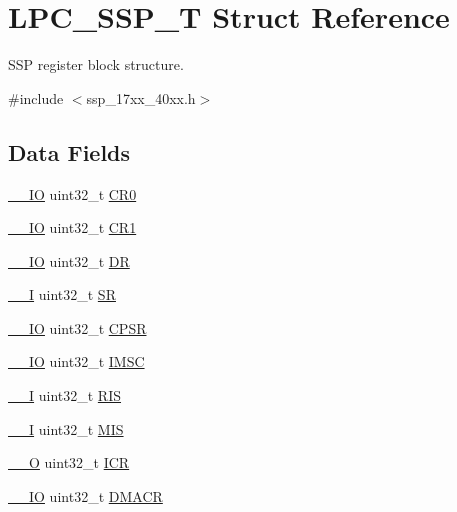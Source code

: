 \hypertarget{structLPC__SSP__T}{\section{L\-P\-C\-\_\-\-S\-S\-P\-\_\-\-T Struct Reference}
\label{structLPC__SSP__T}
}


S\-S\-P register block structure.  




{\ttfamily \#include $<$ssp\-\_\-17xx\-\_\-40xx.\-h$>$}

\subsection*{Data Fields}
\begin{DoxyCompactItemize}
\item 
\hyperlink{core__cm3_8h_aec43007d9998a0a0e01faede4133d6be}{\-\_\-\-\_\-\-I\-O} uint32\-\_\-t \hyperlink{structLPC__SSP__T_af8ad155254cb659608f4c1c6bd83b62b}{C\-R0}
\item 
\hyperlink{core__cm3_8h_aec43007d9998a0a0e01faede4133d6be}{\-\_\-\-\_\-\-I\-O} uint32\-\_\-t \hyperlink{structLPC__SSP__T_a648b740833659e86e8be3a8f6c17147c}{C\-R1}
\item 
\hyperlink{core__cm3_8h_aec43007d9998a0a0e01faede4133d6be}{\-\_\-\-\_\-\-I\-O} uint32\-\_\-t \hyperlink{structLPC__SSP__T_a7a32964f3ca72981b80cf4012c515ea8}{D\-R}
\item 
\hyperlink{core__cm3_8h_af63697ed9952cc71e1225efe205f6cd3}{\-\_\-\-\_\-\-I} uint32\-\_\-t \hyperlink{structLPC__SSP__T_a5f6421682b9a321abc8d4c91a6dbd964}{S\-R}
\item 
\hyperlink{core__cm3_8h_aec43007d9998a0a0e01faede4133d6be}{\-\_\-\-\_\-\-I\-O} uint32\-\_\-t \hyperlink{structLPC__SSP__T_a48e7161fc6e6b91bd724a17df5435141}{C\-P\-S\-R}
\item 
\hyperlink{core__cm3_8h_aec43007d9998a0a0e01faede4133d6be}{\-\_\-\-\_\-\-I\-O} uint32\-\_\-t \hyperlink{structLPC__SSP__T_a5969572eaab7a02f4bbd7c898f93ca73}{I\-M\-S\-C}
\item 
\hyperlink{core__cm3_8h_af63697ed9952cc71e1225efe205f6cd3}{\-\_\-\-\_\-\-I} uint32\-\_\-t \hyperlink{structLPC__SSP__T_a0aa742f8d7d4b2e2a6038b01dbc1aa5b}{R\-I\-S}
\item 
\hyperlink{core__cm3_8h_af63697ed9952cc71e1225efe205f6cd3}{\-\_\-\-\_\-\-I} uint32\-\_\-t \hyperlink{structLPC__SSP__T_aa4b72809de09f83335e72d0d0844a90b}{M\-I\-S}
\item 
\hyperlink{core__cm3_8h_a7e25d9380f9ef903923964322e71f2f6}{\-\_\-\-\_\-\-O} uint32\-\_\-t \hyperlink{structLPC__SSP__T_ad788fb9f7178c7a79588b429f74b9946}{I\-C\-R}
\item 
\hyperlink{core__cm3_8h_aec43007d9998a0a0e01faede4133d6be}{\-\_\-\-\_\-\-I\-O} uint32\-\_\-t \hyperlink{structLPC__SSP__T_a6a74b0cbac37f424e198ccef9a208d65}{D\-M\-A\-C\-R}
\end{DoxyCompactItemize}


